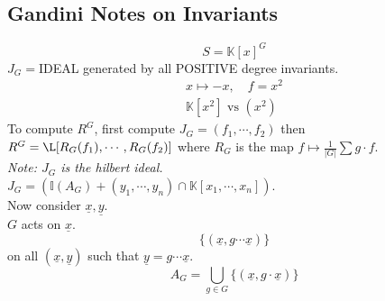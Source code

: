 \documentclass[10pt,oneside]{article}
\newcommand{\K}{\mathbb{K}}
\newcommand{\vpp}{\vspace{0.25cm}\\}
\begin{document}
\subsection*{Gandini Notes on Invariants}
$$S = \K[x]^G$$
$J_G = $IDEAL generated by all POSITIVE degree invariants.
\begin{align*}
    x\mapsto -x, \quad f = x^2\\
    \K[x^2] \text{ vs } (x^2)
\end{align*}
To compute $R^G$, first compute $J_G = (f_1,\cdots, f_2)$ then $R^G=\L[R_G(f_1),\cdots, R_G(f_2)]$ where $R_G$ is the map $f\mapsto \frac{1}{|G|}\sum g\cdot f$.\vpp
\textit{Note: $J_G$ is the hilbert ideal.}\vpp
$J_G=(\mathbb I (A_G) + (y_1,\cdots, y_n)\cap \K[x_1,\cdots, x_n])$. \vpp
Now consider $\underline x, \underline y$.\\
$G$ acts on $\underline x$. 
$$\{(\underline x, g\cdots \underline x)\}$$
on all $(\underline x, \underline y)$ such that $\underline y = g \cdots \underline x$.
$$A_G = \bigcup_{g\in G}\{(\underline x, g\cdot \underline x)\}$$
\end{document}

